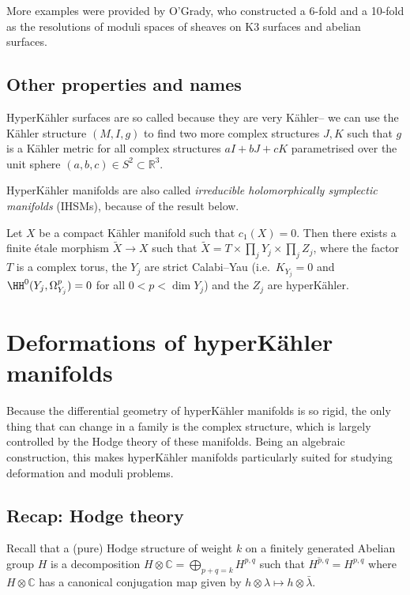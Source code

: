 More examples were provided by O'Grady, who constructed a 6-fold and a 10-fold
as the resolutions of moduli spaces of sheaves on K3 surfaces and abelian
surfaces.

\subsection{Other properties and names} HyperK\"ahler surfaces are so called
because they are very K\"ahler-- we can use the K\"ahler structure \((M,I,g)\)
to find two more complex structures \(J,K\) such that \(g\) is a K\"ahler metric
for all complex structures \(aI+bJ+cK\) parametrised over the unit sphere
\((a,b,c)\in S^2\subset \mathbb{R}^3\).

HyperK\"ahler manifolds are also called \textit{irreducible holomorphically
symplectic manifolds} (IHSMs), because of the result below.

\begin{theorem}
    Let \(X\) be a compact K\"ahler manifold such that \(c_1(X)=0\). Then there
    exists a finite \'etale morphism \(\tilde X\to X\) such that \(\tilde X =
    T\times \prod_j Y_j \times \prod_j Z_j\),  where the factor \(T\) is a
    complex torus, the \(Y_j\) are strict Calabi--Yau (i.e.\ \(K_{Y_j}=0\) and
    \(\HH^0(Y_j, \Omega_{Y_j}^p)=0\) for all \(0<p<\dim Y_j\)) and the \(Z_j\)
    are hyperK\"ahler.
\end{theorem}

\section{Deformations of hyperK\"ahler manifolds}
Because the differential geometry of hyperK\"ahler manifolds is so rigid,
the only thing that can change in a family is the complex structure, which
is largely controlled by the Hodge theory of these manifolds. Being an algebraic
construction, this makes hyperK\"ahler manifolds particularly suited for
studying deformation and moduli problems.

\subsection{Recap: Hodge theory} Recall that a (pure) Hodge structure of weight \(k\) on a finitely generated Abelian group \(H\) is a decomposition \(H\otimes \mathbb{C}=\bigoplus_{p+q=k} H^{p,q}\) such that \(\overline{H^{p,q}}= H^{p,q}\) where \(H\otimes \mathbb{C}\) has a canonical conjugation map given by \(h\otimes \lambda \mapsto h\otimes \bar\lambda\).

